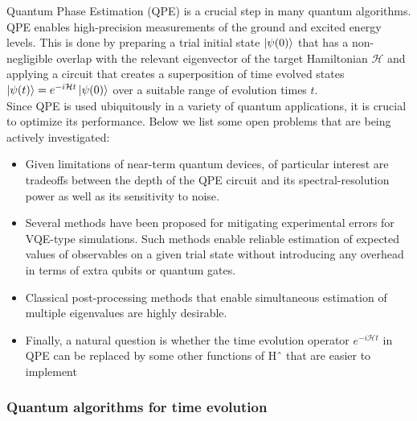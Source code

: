 \documentclass{book}
\theoremstyle{definition}
\newcommand{\had}{\mathcal{H}}
\begin{document}
Quantum Phase Estimation (QPE) is a crucial step in many
quantum algorithms. QPE enables high-precision measurements of the ground and excited energy levels. This is done by preparing a trial initial state $\ket{\psi(0)}$ that has a non-negligible overlap with the relevant eigenvector of the target Hamiltonian $\had$ and applying a circuit that creates a superposition of time evolved states $\ket{\psi(t)} = e^{-i\had t}\ket{\psi(0)}$ over a suitable range of evolution times $t$. \\

Since QPE is used ubiquitously in a variety of quantum applications, it is crucial to optimize its performance. Below we
list some open problems that are being actively investigated:
\begin{itemize}
	\item Given limitations of near-term quantum devices, of particular interest are tradeoffs between the depth of the
	QPE circuit and its spectral-resolution power as well
	as its sensitivity to noise.
	
	\item Several methods have been proposed for mitigating experimental errors for VQE-type simulations. Such methods enable reliable estimation of expected values of observables on a given trial state without introducing any overhead in terms of extra qubits or quantum gates.
	
	
	\item Classical post-processing methods that enable simultaneous estimation of multiple eigenvalues are highly desirable.
	
	\item Finally, a natural question is whether the time evolution
	operator $e^{-i \had t}$
	in QPE can be replaced by some other
	functions of Hˆ that are easier to implement
\end{itemize}




\subsubsection{Quantum algorithms for time evolution}
\end{document}
